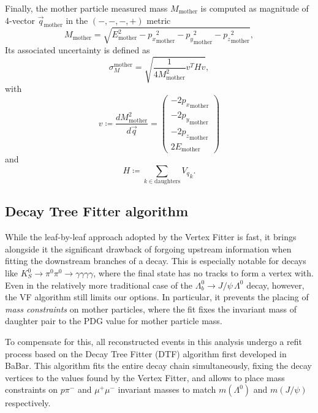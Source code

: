 Finally, the mother particle measured mass $M_\text{mother}$ is computed as magnitude of 4-vector $\vec{q}_\text{mother}$ in the $(-,-,-,+)$ metric
\begin{equation}
	M_\text{mother} = \sqrt{E_\text{mother}^2
	- {p_x}_\text{mother}^2
	- {p_y}_\text{mother}^2
	- {p_z}_\text{mother}^2
	},
\end{equation}
Its associated uncertainty is defined as
\begin{equation}
	\sigma_M^\text{mother} = \sqrt{
		\frac{1}{4 M_\text{mother}^2}
		v^T
		H
		v
	},
\end{equation}
with
\begin{equation}
	v \coloneqq \frac{dM_\text{mother}^2}{d\vec{q}}
	= \begin{pmatrix}
		-2 {p_x}_\text{mother} \\
		-2 {p_y}_\text{mother} \\
		-2 {p_z}_\text{mother} \\
		2 E_\text{mother}
	\end{pmatrix}
\end{equation}
and
\begin{equation}
	H \coloneqq \sum_{k \in \text{daughters}} {V_q}_k.
\end{equation}

\subsection{Decay Tree Fitter algorithm}
\label{sec:3:dtf}
While the leaf-by-leaf approach adopted by the Vertex Fitter is fast, it brings alongside it the significant drawback of forgoing upstream information when fitting the downstream branches of a decay.
This is especially notable for decays like $K_S^0 \rightarrow \pi^0\pi^0 \rightarrow \gamma\gamma\gamma\gamma$, where the final state has no tracks to form a vertex with.
Even in the relatively more traditional case of the $\Lambda_b^0 \rightarrow J/\psi\,\Lambda^0$ decay, however, the VF algorithm still limits our options.
In particular, it prevents the placing of \textit{mass constraints} on mother particles, where the fit fixes the invariant mass of daughter pair to the PDG value for mother particle mass.

To compensate for this, all reconstructed events in this analysis undergo a refit process based on the Decay Tree Fitter (DTF) algorithm \cite{Hulsbergen:2005pu} first developed in BaBar.
This algorithm fits the entire decay chain simultaneously, fixing the decay vertices to the values found by the Vertex Fitter, and allows to place mass constraints on $p\pi^-$ and $\mu^+\mu^-$ invariant masses to match $m(\Lambda^0)$ and $m(J/\psi)$ respectively.

